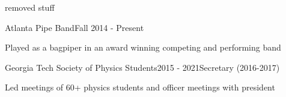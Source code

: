\documentclass{resume} %
\begin{document}
\iffalse

\begin{rSection}{removed stuff}
\begin{rSubsection}{Atlanta Pipe Band}{Fall 2014 - Present}{}{}
\item Played as a bagpiper in an award winning competing and performing band
\end{rSubsection}

\begin{rSubsection}{Georgia Tech Society of Physics Students}{2015 - 2021}{Secretary (2016-2017)}{}
\item Led meetings of 60+ physics students and officer meetings with president 
\end{rSubsection}


\end{rSection}
\end{document}

